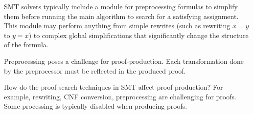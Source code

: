 \documentclass{llncs}
\newcommand{\Note}[1]{\textcolor{blue}{[#1]}}
\begin{document}
SMT solvers typically include a module for preprocessing formulas to simplify
them before running the main algorithm to search for a satisfying assignment.
This module may perform anything from simple rewrites (such as rewriting $x=y$
to $y=x$) to complex global simplifications that significantly change the
structure of the formula.

Preprocessing poses a challenge for proof-production.  Each transformation done
by the preprocessor must be reflected in the produced proof.

How do the proof search techniques in SMT affect proof production?  For
example, rewriting, CNF conversion, preprocessing are challenging for proofs.
Some processing is typically disabled when producing proofs.








\end{document}
